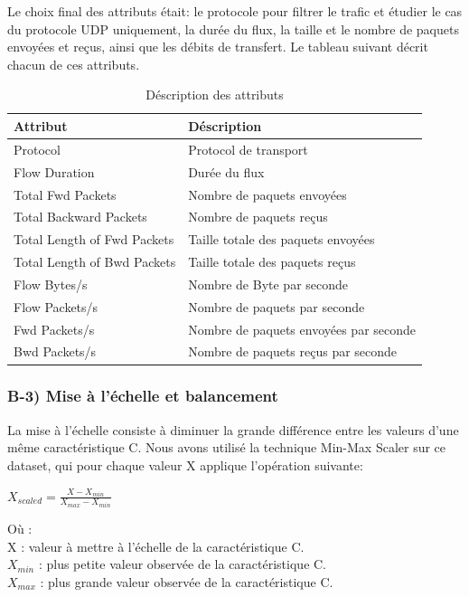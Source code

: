 \noindent Le choix final des attributs était: le protocole pour filtrer le trafic et étudier le cas du protocole UDP uniquement, la durée du flux, la taille et le nombre de paquets envoyées et reçus, ainsi que les débits de transfert. Le tableau suivant décrit chacun de ces attributs.
\begin{table}[h]
\begin{center}
\begin{tabular}{ | m{4cm} | m{10cm} | }
\hline
\rowcolor[rgb]{0.85,0.85,0.85}
\textbf{Attribut} & \textbf{Déscription}\\
\hline
Protocol & Protocol de transport\\
\hline
Flow Duration & Durée du flux\\
\hline
Total Fwd Packets & Nombre de paquets envoyées \\
\hline
Total Backward Packets &  Nombre de paquets reçus \\
\hline
Total Length of Fwd Packets & Taille totale des paquets envoyées \\
\hline
Total Length of Bwd Packets & Taille totale des paquets reçus \\
\hline
Flow Bytes/s &  Nombre de Byte par seconde\\ 
\hline
Flow Packets/s &  Nombre de paquets par seconde\\
\hline
Fwd Packets/s & Nombre de paquets envoyées par seconde \\
\hline
Bwd Packets/s & Nombre de paquets reçus par seconde \\
\hline
\end{tabular}
\caption{Déscription des attributs}
\label{table:attributs}
\end{center}
\end{table}

\newpage
\subsubsection{B-3) Mise à l'échelle et balancement}
La mise à l'échelle consiste à diminuer la grande différence entre les valeurs d'une même caractéristique C. Nous avons utilisé la technique Min-Max Scaler sur ce dataset, qui pour chaque valeur X applique l'opération suivante:
\begin{center}
{\large $ X_{scaled} = \frac{X - X_{min}}{X_{max} - X_{min}} $}
\end{center}
Où :\\
\indent X : valeur à mettre à l'échelle de la caractéristique C.\\
\indent $X_{min}$ : plus petite valeur observée de la caractéristique C.\\
\indent $X_{max}$ : plus grande valeur observée de la caractéristique C.\\

